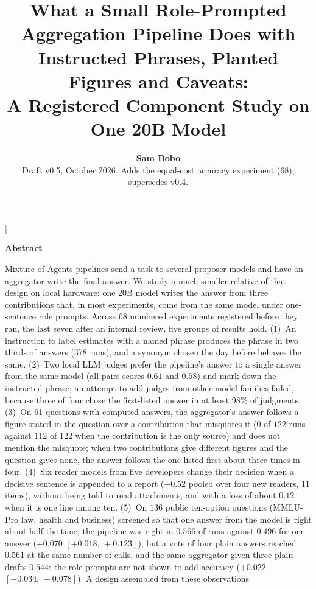 \documentclass[10pt,twocolumn]{article}
\title{\LARGE\bfseries What a Small Role-Prompted Aggregation Pipeline Does with Instructed Phrases, Planted Figures and Caveats:\\ A Registered Component Study on One 20B Model}
\author{\textbf{Sam Bobo}\\ \small Draft v0.5, October 2026. Adds the equal-cost accuracy experiment (68); supersedes v0.4.}
\date{}
\newcommand{\ci}[2]{\ensuremath{[#1,\,#2]}}
\begin{document}
\twocolumn[
\begin{@twocolumnfalse}
\maketitle
\thispagestyle{fancy}
\begin{center}
\begin{minipage}{0.9\textwidth}
\begin{center}\textbf{Abstract}\end{center}
\small
Mixture-of-Agents pipelines send a task to several proposer models and
have an aggregator write the final answer. We study a much smaller
relative of that design on local hardware: one 20B model writes the
answer from three contributions that, in most experiments, come from
the same model under one-sentence role prompts. Across 68 numbered
experiments registered before they ran, the last seven after an internal
review, five groups of results hold. (1)~An instruction to label
estimates with a named phrase produces the phrase in two thirds of
answers (378 runs), and a synonym chosen the day before behaves the
same. (2)~Two local LLM judges prefer the pipeline's answer to a single
answer from the same model (all-pairs scores $0.61$ and $0.58$) and
mark down the instructed phrase; an attempt to add judges from other
model families failed, because three of four chose the first-listed
answer in at least 98\% of judgments. (3)~On 61 questions with computed
answers, the aggregator's answer follows a figure stated in the
question over a contribution that misquotes it ($0$ of $122$ runs
against $112$ of $122$ when the contribution is the only source) and
does not mention the misquote; when two contributions give different
figures and the question gives none, the answer follows the one listed
first about three times in four. (4)~Six reader models from five
developers change their decision when a decisive sentence is appended to
a report ($+0.52$ pooled over four new readers, 11 items), without
being told to read attachments, and with a loss of about $0.12$ when it
is one line among ten. (5)~On 136 public ten-option questions
(MMLU-Pro law, health and business) screened so that one answer from
the model is right about half the time, the pipeline was right in
$0.566$ of runs against $0.496$ for one answer ($+0.070$
\ci{+0.018}{+0.123}), but a vote of four plain answers reached $0.561$
at the same number of calls, and the same aggregator given three plain
drafts $0.544$: the role prompts are not shown to add accuracy ($+0.022$
\ci{-0.034}{+0.078}). A design assembled from these observations

\end{minipage}
\end{center}
\end{@twocolumnfalse}
\end{document}
